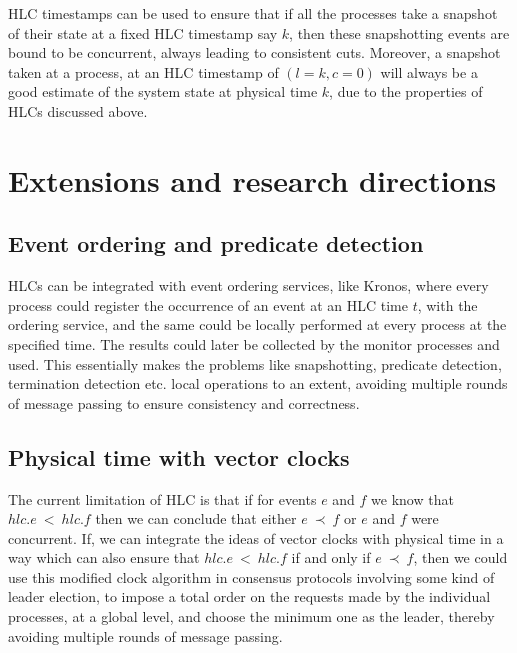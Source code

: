 \documentclass{article}
\begin{document}
    HLC timestamps can be used to ensure that if all the processes take a snapshot of their state at a fixed HLC timestamp say $k$, then these snapshotting events are bound to be concurrent, always leading to consistent cuts. Moreover, a snapshot taken at a process, at an HLC timestamp of $(l=k,c=0)$ will always be a good estimate of the system state at physical time $k$, due to the properties of HLCs discussed above.

    \section{Extensions and research directions}

    \subsection{Event ordering and predicate detection}

    HLCs can be integrated with event ordering services, like Kronos\cite{kronos}, where every process could register the occurrence of an event at an HLC time $t$, with the ordering service, and the same could be locally performed at every process at the specified time. The results could later be collected by the monitor processes and used. This essentially makes the problems like snapshotting, predicate detection, termination detection etc. local operations to an extent, avoiding multiple rounds of message passing to ensure consistency and correctness.

    \subsection{Physical time with vector clocks}

    The current limitation of HLC is that if for events $e$ and $f$ we know that $hlc.e\ <\ hlc.f$ then we can conclude that either $e\ \prec\ f$ or $e$ and $f$ were concurrent. If, we can integrate the ideas of vector clocks with physical time in a way which can also ensure that $hlc.e\ <\ hlc.f$ if and only if $e\ \prec\ f$, then we could use this modified clock algorithm in consensus protocols involving some kind of leader election, to impose a total order on the requests made by the individual processes, at a global level, and choose the minimum one as the leader, thereby avoiding multiple rounds of message passing.

    \newpage



\end{document}
